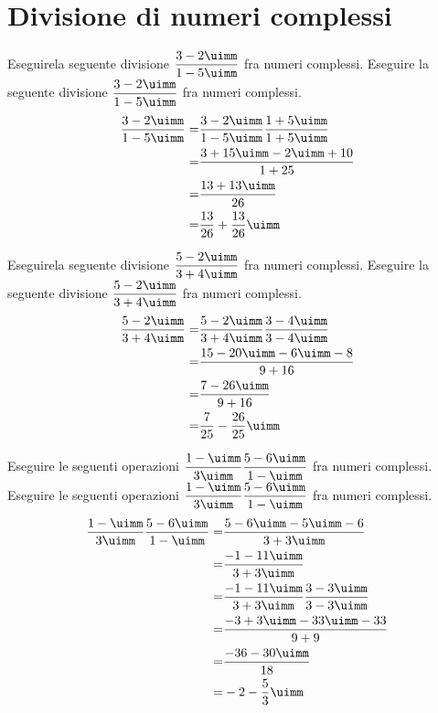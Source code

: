  \section{Divisione di  numeri complessi}
\begin{exercise}
	Eseguirela seguente divisione $\dfrac{3-2\uimm}{1-5\uimm}$ fra numeri complessi.
	\tcblower
	Eseguire la seguente divisione  $\dfrac{3-2\uimm}{1-5\uimm}$ fra numeri complessi.
	\begin{align*}
	\dfrac{3-2\uimm}{1-5\uimm}=&\dfrac{3-2\uimm}{1-5\uimm}\dfrac{1+5\uimm}{1+5\uimm}\\
	=&\dfrac{3+15\uimm-2\uimm+10}{1+25}\\
	=&\dfrac{13+13\uimm}{26}\\
	=&\dfrac{13}{26}+\dfrac{13}{26}\uimm\\
	\end{align*}
\end{exercise}
\begin{exercise}
	Eseguirela seguente divisione $\dfrac{5-2\uimm}{3+4\uimm}$ fra numeri complessi.
	\tcblower
	Eseguire la seguente divisione  $\dfrac{5-2\uimm}{3+4\uimm}$ fra numeri complessi.
	\begin{align*}
	\dfrac{5-2\uimm}{3+4\uimm}=&\dfrac{5-2\uimm}{3+4\uimm}\dfrac{3-4\uimm}{3-4\uimm}\\
	=&\dfrac{15-20\uimm-6\uimm-8}{9+16}\\
	=&\dfrac{7-26\uimm}{9+16}\\
	=&\dfrac{7}{25}-\dfrac{26}{25}\uimm\\
	\end{align*}
\end{exercise}
\begin{exercise}
	Eseguire le seguenti operazioni  $\dfrac{1-\uimm}{3\uimm}\dfrac{5-6\uimm}{1-\uimm}$ fra numeri complessi.
	\tcblower
	Eseguire le seguenti operazioni  $\dfrac{1-\uimm}{3\uimm}\dfrac{5-6\uimm}{1-\uimm}$ fra numeri complessi.
	\begin{align*}
	\dfrac{1-\uimm}{3\uimm}\dfrac{5-6\uimm}{1-\uimm}=&\dfrac{5-6\uimm-5\uimm-6}{3+3\uimm}\\
	=&\dfrac{-1-11\uimm}{3+3\uimm}\\
	=&\dfrac{-1-11\uimm}{3+3\uimm}\dfrac{3-3\uimm}{3-3\uimm}\\
	=&\dfrac{-3+3\uimm-33\uimm-33}{9+9}\\
	=&\dfrac{-36-30\uimm}{18}\\
	=&-2-\dfrac{5}{3}\uimm
	\end{align*}
\end{exercise}

